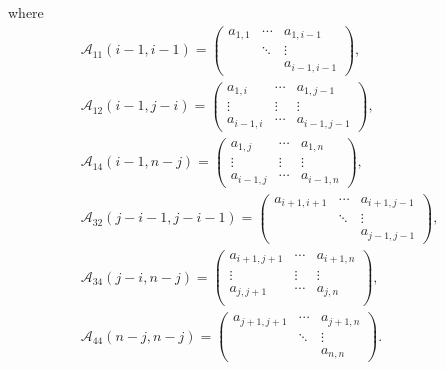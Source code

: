 \documentclass[pdftex]{sigma}
\numberwithin{equation}{section}
\def\A{\mathscr{A}}
\begin{document}
where
\begin{gather*}
\A_{11}(i-1,i-1)=
 \begin{pmatrix}
 a_{1, 1} & \cdots & a_{1, i-1}\\
 & \ddots & \vdots \\
 & & a_{i-1, i-1}
 \end{pmatrix}
,
 \\
 \A_{12}(i-1,j-i)=
 \begin{pmatrix}
 a_{1, i} & \cdots & a_{1, j-1}\\
 \vdots & \vdots & \vdots \\
 a_{i-1, i} & \cdots & a_{i-1, j-1}
 \end{pmatrix}
, \\
\A_{14}(i-1,n-j)=
 \begin{pmatrix}
 a_{1, j} & \cdots & a_{1, n}\\
 \vdots & \vdots & \vdots \\
 a_{i-1, j} & \cdots & a_{i-1, n}
 \end{pmatrix},
 \\
\A_{32}(j-i-1,j-i-1)=
 \begin{pmatrix}
 a_{i+1, i+1} & \cdots & a_{i+1, j-1}\\
 & \ddots & \vdots \\
 & & a_{j-1, j-1}
 \end{pmatrix}
,\\
 \A_{34}(j-i,n-j)=
 \begin{pmatrix}
 a_{i+1, j+1} & \cdots & a_{i+1, n}\\
 \vdots & \vdots & \vdots \\
 a_{j, j+1} & \cdots & a_{j, n}\\
 \end{pmatrix}
,
 \\
 \A_{44}(n-j,n-j)=
 \begin{pmatrix}
 a_{j+1, j+1} & \cdots & a_{j+1, n}\\
 & \ddots & \vdots \\
 & & a_{n,n}
 \end{pmatrix}.
 \end{gather*}
\end{document}
